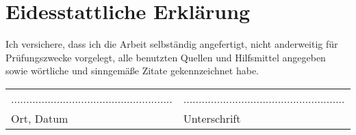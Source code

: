 \chapter*{Eidesstattliche Erklärung}
\thispagestyle{empty}

Ich versichere, dass ich die Arbeit selbständig angefertigt, nicht anderweitig für Prüfungszwecke vorgelegt, alle benutzten Quellen und Hilfsmittel angegeben sowie wörtliche und sinngemäße Zitate gekennzeichnet habe.

\vspace{4em}

\begin{tabular}{@{} p{} l @{}}
..................................................... & ..................................................... \\
Ort, Datum                                            & Unterschrift
\end{tabular}
